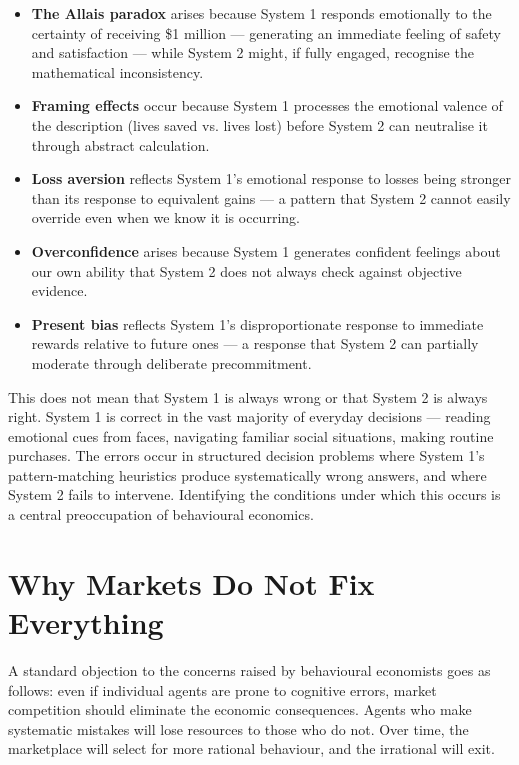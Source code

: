 \documentclass[12pt, letterpaper]{article}
\begin{document}
\begin{itemize}
\item \textbf{The Allais paradox} arises because System 1 responds emotionally to the certainty of receiving \$1 million --- generating an immediate feeling of safety and satisfaction --- while System 2 might, if fully engaged, recognise the mathematical inconsistency.
\item \textbf{Framing effects} occur because System 1 processes the emotional valence of the description (lives saved vs. lives lost) before System 2 can neutralise it through abstract calculation.
\item \textbf{Loss aversion} reflects System 1's emotional response to losses being stronger than its response to equivalent gains --- a pattern that System 2 cannot easily override even when we know it is occurring.
\item \textbf{Overconfidence} arises because System 1 generates confident feelings about our own ability that System 2 does not always check against objective evidence.
\item \textbf{Present bias} reflects System 1's disproportionate response to immediate rewards relative to future ones --- a response that System 2 can partially moderate through deliberate precommitment.
\end{itemize}

This does not mean that System 1 is always wrong or that System 2 is always right. System 1 is correct in the vast majority of everyday decisions --- reading emotional cues from faces, navigating familiar social situations, making routine purchases. The errors occur in structured decision problems where System 1's pattern-matching heuristics produce systematically wrong answers, and where System 2 fails to intervene. Identifying the conditions under which this occurs is a central preoccupation of behavioural economics.

\medskip


\section{Why Markets Do Not Fix Everything}


A standard objection to the concerns raised by behavioural economists goes as follows: even if individual agents are prone to cognitive errors, market competition should eliminate the economic consequences. Agents who make systematic mistakes will lose resources to those who do not. Over time, the marketplace will select for more rational behaviour, and the irrational will exit.
\end{document}
